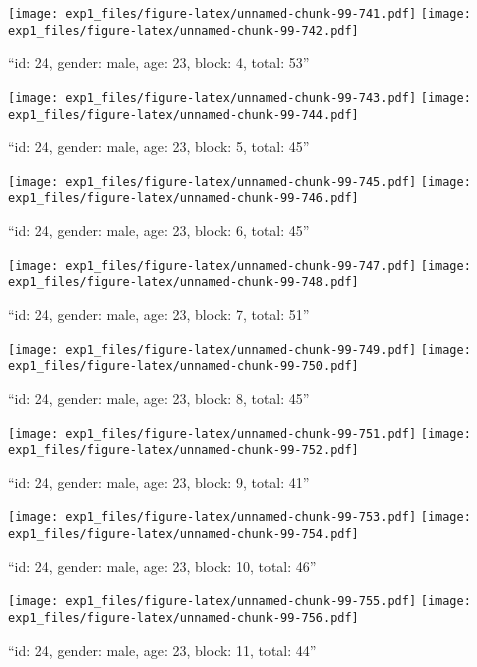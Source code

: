 \documentclass[,]{article}
\begin{document}
\texttt{[image: exp1\_files/figure-latex/unnamed-chunk-99-741.pdf]}
\texttt{[image: exp1\_files/figure-latex/unnamed-chunk-99-742.pdf]}

\newpage
[1] 

``id: 24, gender: male, age: 23, block: 4, total: 53''

\texttt{[image: exp1\_files/figure-latex/unnamed-chunk-99-743.pdf]}
\texttt{[image: exp1\_files/figure-latex/unnamed-chunk-99-744.pdf]}

\newpage
[1] 

``id: 24, gender: male, age: 23, block: 5, total: 45''

\texttt{[image: exp1\_files/figure-latex/unnamed-chunk-99-745.pdf]}
\texttt{[image: exp1\_files/figure-latex/unnamed-chunk-99-746.pdf]}

\newpage
[1] 

``id: 24, gender: male, age: 23, block: 6, total: 45''

\texttt{[image: exp1\_files/figure-latex/unnamed-chunk-99-747.pdf]}
\texttt{[image: exp1\_files/figure-latex/unnamed-chunk-99-748.pdf]}

\newpage
[1] 

``id: 24, gender: male, age: 23, block: 7, total: 51''

\texttt{[image: exp1\_files/figure-latex/unnamed-chunk-99-749.pdf]}
\texttt{[image: exp1\_files/figure-latex/unnamed-chunk-99-750.pdf]}

\newpage
[1] 

``id: 24, gender: male, age: 23, block: 8, total: 45''

\texttt{[image: exp1\_files/figure-latex/unnamed-chunk-99-751.pdf]}
\texttt{[image: exp1\_files/figure-latex/unnamed-chunk-99-752.pdf]}

\newpage
[1] 

``id: 24, gender: male, age: 23, block: 9, total: 41''

\texttt{[image: exp1\_files/figure-latex/unnamed-chunk-99-753.pdf]}
\texttt{[image: exp1\_files/figure-latex/unnamed-chunk-99-754.pdf]}

\newpage
[1] 

``id: 24, gender: male, age: 23, block: 10, total: 46''

\texttt{[image: exp1\_files/figure-latex/unnamed-chunk-99-755.pdf]}
\texttt{[image: exp1\_files/figure-latex/unnamed-chunk-99-756.pdf]}

\newpage
[1] 

``id: 24, gender: male, age: 23, block: 11, total: 44''
\end{document}
